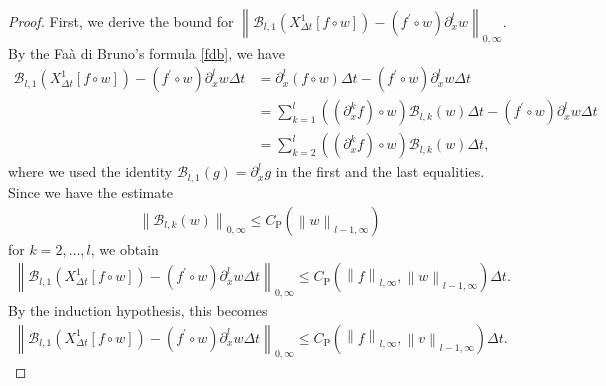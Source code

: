 \documentclass[10pt,a4paper,tbtags,leqno]{amsart}
\theoremstyle{definition}
\numberwithin{equation}{section}
\def\norm#1#2{\left\|#2\right\|_{#1}}
\begin{document}
\begin{proof}
  First, we derive the bound for $ \norm{0, \infty}{\mathcal{B}_{l, 1} ({X_{\Delta t}^1} [ f \circ w]) - (f^\prime\circ w) \partial_x^l w} $. By the Fa\`a di Bruno's formula \eqref{fdb}, we have 
  \begin{align}
    \mathcal{B}_{l, 1} ({X_{\Delta t}^1} [ f \circ w]) - (f^\prime\circ w) \partial_x^l w \Delta t
    & = \partial_x^l (f \circ w) \Delta t - (f^\prime\circ w) \partial_x^l w \Delta t \\
    & = \sum_{k=1}^l ((\partial_x^k f) \circ w) \mathcal{B}_{l,k}(w) \Delta t - (f^\prime\circ w) \partial_x^l w \Delta t \\
    & = \sum_{k=2}^l ((\partial_x^k f) \circ w) \mathcal{B}_{l,k}(w) \Delta t, 
  \end{align}
  where we used the identity $ \mathcal{B}_{l,1}(g) = \partial_x^l g $ in the first and the last equalities. 
  Since we have the estimate 
  \begin{align}
    \norm{0,\infty}{\mathcal{B}_{l,k}(w)} \leq C_{\mathrm{P}} (\norm{l - 1, \infty}{w}) 
  \end{align}
  for $ k = 2, \ldots, l $, we obtain 
  \begin{align}
    \norm{0, \infty}{\mathcal{B}_{l, 1} ({X_{\Delta t}^1} [ f \circ w]) - (f^\prime\circ w) \partial_x^l w \Delta t}
    \leq C_{\mathrm{P}} (\norm{l, \infty}{f}, \norm{l - 1, \infty}{w}) \Delta t. 
  \end{align} 
  By the induction hypothesis, this becomes 
  \begin{align}
    \norm{0, \infty}{\mathcal{B}_{l, 1} ({X_{\Delta t}^1} [ f \circ w]) - (f^\prime\circ w) \partial_x^l w \Delta t} 
    \leq C_{\mathrm{P}} (\norm{l, \infty}{f}, \norm{l - 1, \infty}{v}) \Delta t. \label{a19} 
  \end{align} 
  

\end{proof}
\end{document}
